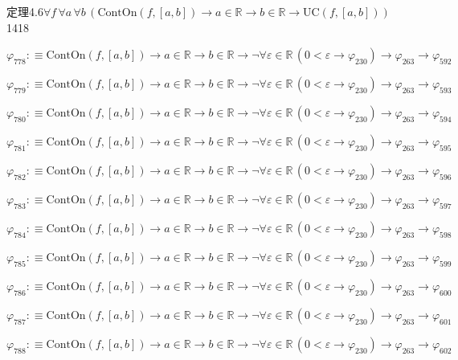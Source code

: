 \begin{fullproof}{定理4.6}{$\forall f\,\forall a\,\forall b\,(\mathrm{ContOn}(f,[a,b]) \to a \in \mathbb{R} \to b \in \mathbb{R} \to \mathrm{UC}(f,[a,b]))$}{1418}
\begin{abbrevlist}
\item $\varphi_{778} :\equiv \mathrm{ContOn}(f,[a,b]) \to a \in \mathbb{R} \to b \in \mathbb{R} \to \neg \forall \varepsilon \in \mathbb{R}\,(0 < \varepsilon \to \varphi_{230}) \to \varphi_{263} \to \varphi_{592}$
\item $\varphi_{779} :\equiv \mathrm{ContOn}(f,[a,b]) \to a \in \mathbb{R} \to b \in \mathbb{R} \to \neg \forall \varepsilon \in \mathbb{R}\,(0 < \varepsilon \to \varphi_{230}) \to \varphi_{263} \to \varphi_{593}$
\item $\varphi_{780} :\equiv \mathrm{ContOn}(f,[a,b]) \to a \in \mathbb{R} \to b \in \mathbb{R} \to \neg \forall \varepsilon \in \mathbb{R}\,(0 < \varepsilon \to \varphi_{230}) \to \varphi_{263} \to \varphi_{594}$
\item $\varphi_{781} :\equiv \mathrm{ContOn}(f,[a,b]) \to a \in \mathbb{R} \to b \in \mathbb{R} \to \neg \forall \varepsilon \in \mathbb{R}\,(0 < \varepsilon \to \varphi_{230}) \to \varphi_{263} \to \varphi_{595}$
\item $\varphi_{782} :\equiv \mathrm{ContOn}(f,[a,b]) \to a \in \mathbb{R} \to b \in \mathbb{R} \to \neg \forall \varepsilon \in \mathbb{R}\,(0 < \varepsilon \to \varphi_{230}) \to \varphi_{263} \to \varphi_{596}$
\item $\varphi_{783} :\equiv \mathrm{ContOn}(f,[a,b]) \to a \in \mathbb{R} \to b \in \mathbb{R} \to \neg \forall \varepsilon \in \mathbb{R}\,(0 < \varepsilon \to \varphi_{230}) \to \varphi_{263} \to \varphi_{597}$
\item $\varphi_{784} :\equiv \mathrm{ContOn}(f,[a,b]) \to a \in \mathbb{R} \to b \in \mathbb{R} \to \neg \forall \varepsilon \in \mathbb{R}\,(0 < \varepsilon \to \varphi_{230}) \to \varphi_{263} \to \varphi_{598}$
\item $\varphi_{785} :\equiv \mathrm{ContOn}(f,[a,b]) \to a \in \mathbb{R} \to b \in \mathbb{R} \to \neg \forall \varepsilon \in \mathbb{R}\,(0 < \varepsilon \to \varphi_{230}) \to \varphi_{263} \to \varphi_{599}$
\item $\varphi_{786} :\equiv \mathrm{ContOn}(f,[a,b]) \to a \in \mathbb{R} \to b \in \mathbb{R} \to \neg \forall \varepsilon \in \mathbb{R}\,(0 < \varepsilon \to \varphi_{230}) \to \varphi_{263} \to \varphi_{600}$
\item $\varphi_{787} :\equiv \mathrm{ContOn}(f,[a,b]) \to a \in \mathbb{R} \to b \in \mathbb{R} \to \neg \forall \varepsilon \in \mathbb{R}\,(0 < \varepsilon \to \varphi_{230}) \to \varphi_{263} \to \varphi_{601}$
\item $\varphi_{788} :\equiv \mathrm{ContOn}(f,[a,b]) \to a \in \mathbb{R} \to b \in \mathbb{R} \to \neg \forall \varepsilon \in \mathbb{R}\,(0 < \varepsilon \to \varphi_{230}) \to \varphi_{263} \to \varphi_{602}$

\end{abbrevlist}
\end{fullproof}
